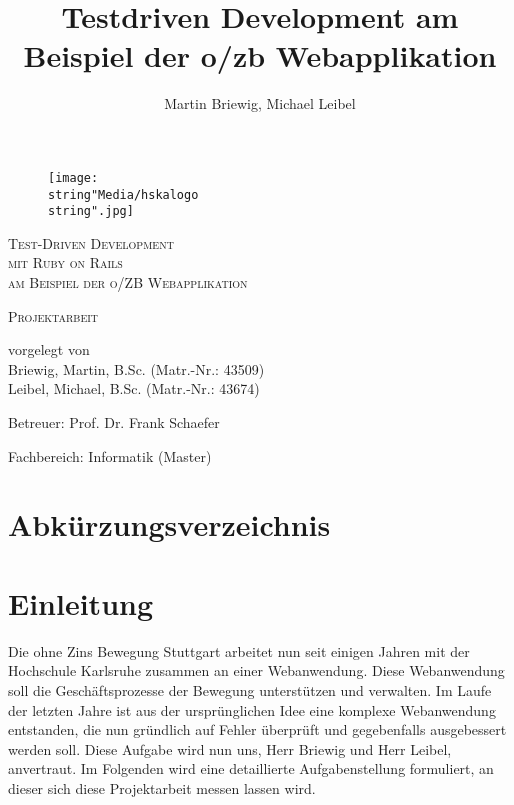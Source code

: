 \documentclass[12pt,             %
               a4paper,          %
               listof=totoc,     %
               index=totoc,      %
               bibliography=totoc,%
               oneside,         %
               BCOR1cm,          %
               english   %
               ]{scrbook}
\title{Testdriven Development am Beispiel der o/zb Webapplikation}
\author{Martin Briewig, Michael Leibel}
\begin{document}
\pagestyle{empty}
\begin{center}

\begin{figure}[h]
	\begin{center}
		\texttt{[image: \\string"Media/hskalogo\\string".jpg]}
	\end{center}
	\label{fig:hska_logo}
\end{figure} 

\vspace{5\baselineskip}

\textsc{\Huge Test-Driven Development\\ mit Ruby on Rails}\\[0.25cm]
\textsc{\large am Beispiel der o/ZB Webapplikation}\\[1.5cm]


\vspace{2\baselineskip}

\textsc{\LARGE Projektarbeit}\\[1.5cm]


\vspace{5\baselineskip}

vorgelegt von\\
Briewig, Martin, B.Sc. (Matr.-Nr.: 43509)\\
Leibel, Michael, B.Sc. (Matr.-Nr.: 43674)

\vspace{\baselineskip}

Betreuer: Prof. Dr. Frank Schaefer

Fachbereich: Informatik (Master)
\end{center}

\clearpage{}


\tableofcontents{}

\clearpage{}

\chapter*{Abkürzungsverzeichnis}

\begin{acronym}[SQL]
\end{acronym}

\newpage

\chapter{Einleitung}
Die ohne Zins Bewegung Stuttgart arbeitet nun seit einigen Jahren mit der Hochschule Karlsruhe zusammen an einer Webanwendung. Diese Webanwendung soll die Geschäftsprozesse der Bewegung unterstützen und verwalten. Im Laufe der letzten Jahre ist aus der ursprünglichen Idee eine komplexe Webanwendung entstanden, die nun gründlich auf Fehler überprüft und gegebenfalls ausgebessert werden soll. 
Diese Aufgabe wird nun uns, Herr Briewig und Herr Leibel, anvertraut. Im Folgenden wird eine detaillierte Aufgabenstellung formuliert, an dieser sich diese Projektarbeit messen lassen wird.  
\end{document}
